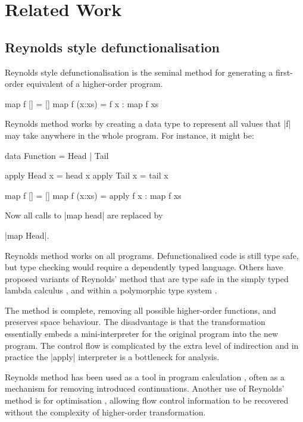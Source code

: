 \section{Related Work}
\label{secF:related}

\subsection{Reynolds style defunctionalisation}

Reynolds style defunctionalisation \cite{reynolds:defunc} is the seminal method for generating a first-order equivalent of a higher-order program.

\begin{example}
\begin{code}
map f []     = []
map f (x:xs) = f x : map f xs
\end{code}

\noindent Reynolds method works by creating a data type to represent all values that |f| may take anywhere in the whole program. For instance, it might be:

\ignore\begin{code}
data Function = Head | Tail

apply Head  x = head  x
apply Tail  x = tail  x

map f []     = []
map f (x:xs) = apply f x : map f xs
\end{code}

\noindent Now all calls to |map head| are replaced by \ignore|map Head|.
\end{example}

Reynolds method works on all programs. Defunctionalised code is still type safe, but type checking would require a dependently typed language. Others have proposed variants of Reynolds' method that are type safe in the simply typed lambda calculus \cite{bell:type_driven_defunctionalization}, and within a polymorphic type system \cite{pottier:polymorhpic_typed_defunctionaization}.

The method is complete, removing all possible higher-order functions, and preserves space behaviour. The disadvantage is that the transformation essentially embeds a mini-interpreter for the original program into the new program. The control flow is complicated by the extra level of indirection and in practice the |apply| interpreter is a bottleneck for analysis.

Reynolds method has been used as a tool in program calculation \cite{danvy:defunctionalization_at_work,hutton:calculating_an_exceptional_machine}, often as a mechanism for removing introduced continuations. Another use of Reynolds' method is for optimisation \cite{grin,jhc}, allowing flow control information to be recovered without the complexity of higher-order transformation.

